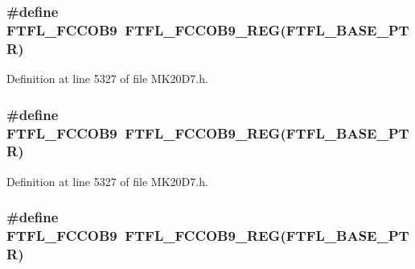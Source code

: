 \subsubsection[{\texorpdfstring{F\+T\+F\+L\+\_\+\+F\+C\+C\+O\+B9}{FTFL_FCCOB9}}]{\setlength{\rightskip}{0pt plus 5cm}\#define F\+T\+F\+L\+\_\+\+F\+C\+C\+O\+B9~{\bf F\+T\+F\+L\+\_\+\+F\+C\+C\+O\+B9\+\_\+\+R\+EG}({\bf F\+T\+F\+L\+\_\+\+B\+A\+S\+E\+\_\+\+P\+TR})}\hypertarget{group___f_t_f_l___register___accessor___macros_ga631d3acc01c150e51dee3cfaf5b37aeb}{}\label{group___f_t_f_l___register___accessor___macros_ga631d3acc01c150e51dee3cfaf5b37aeb}


Definition at line 5327 of file M\+K20\+D7.\+h.

\subsubsection[{\texorpdfstring{F\+T\+F\+L\+\_\+\+F\+C\+C\+O\+B9}{FTFL_FCCOB9}}]{\setlength{\rightskip}{0pt plus 5cm}\#define F\+T\+F\+L\+\_\+\+F\+C\+C\+O\+B9~{\bf F\+T\+F\+L\+\_\+\+F\+C\+C\+O\+B9\+\_\+\+R\+EG}({\bf F\+T\+F\+L\+\_\+\+B\+A\+S\+E\+\_\+\+P\+TR})}\hypertarget{group___f_t_f_l___register___accessor___macros_ga631d3acc01c150e51dee3cfaf5b37aeb}{}\label{group___f_t_f_l___register___accessor___macros_ga631d3acc01c150e51dee3cfaf5b37aeb}


Definition at line 5327 of file M\+K20\+D7.\+h.

\subsubsection[{\texorpdfstring{F\+T\+F\+L\+\_\+\+F\+C\+C\+O\+B9}{FTFL_FCCOB9}}]{\setlength{\rightskip}{0pt plus 5cm}\#define F\+T\+F\+L\+\_\+\+F\+C\+C\+O\+B9~{\bf F\+T\+F\+L\+\_\+\+F\+C\+C\+O\+B9\+\_\+\+R\+EG}({\bf F\+T\+F\+L\+\_\+\+B\+A\+S\+E\+\_\+\+P\+TR})}\hypertarget{group___f_t_f_l___register___accessor___macros_ga631d3acc01c150e51dee3cfaf5b37aeb}{}\label{group___f_t_f_l___register___accessor___macros_ga631d3acc01c150e51dee3cfaf5b37aeb}



